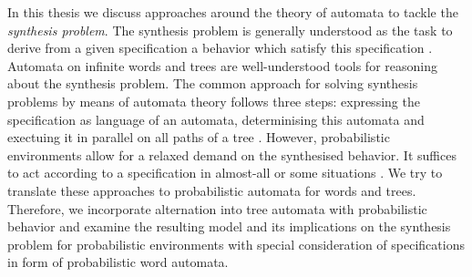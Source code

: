 In this thesis we discuss approaches around the theory of automata to tackle
the \emph{synthesis problem}. The synthesis problem is generally understood as
the task to derive from a given specification a behavior which satisfy this
specification \cite{Church}. Automata on infinite words and trees are
well-understood tools for reasoning about the synthesis problem. The common
approach for solving synthesis problems by means of automata theory follows
three steps: expressing the specification as language of an automata,
determinising this automata and exectuing it in parallel on all paths of a tree
\cite{ChurchsProblemRevisited,SynProbEnv,AutoInfObj,ParityGamesPosDet}.
However, probabilistic environments allow for a relaxed demand on the
synthesised behavior. It suffices to act according to a specification in
almost-all or some situations \cite{SynProbEnv,PrinciplesOfMC,QualAnaPOMDP}. We
try to translate these approaches to probabilistic automata for words and
trees. Therefore, we incorporate alternation into tree automata with
probabilistic behavior and examine the resulting model and its implications on
the synthesis problem for probabilistic environments with special consideration
of specifications in form of probabilistic word automata.
